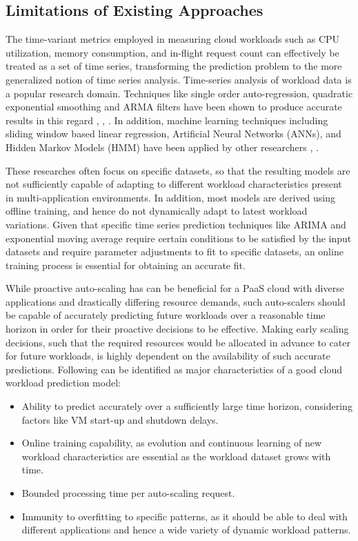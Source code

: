 \subsection{Limitations of Existing Approaches}

The time-variant metrics employed in measuring cloud workloads such as CPU utilization, memory consumption, and in-flight request count can effectively be treated as a set of time series, transforming the prediction problem to the more generalized notion of time series analysis. Time-series analysis of workload data is a popular research domain. Techniques like single order auto-regression, quadratic exponential smoothing and ARMA filters have been shown to produce accurate results in this regard \cite{Kupferman_2009}, \cite{Mi_2010}, \cite{Roy_2011}. In addition, machine learning techniques including sliding window based linear regression, Artificial Neural Networks (ANNs), and Hidden Markov Models (HMM) have been applied by other researchers \cite{Yang_2013}, \cite{Khan_2012}.

These researches often focus on specific datasets, so that the resulting models are not sufficiently capable of adapting to different workload characteristics present in multi-application environments. In addition, most models are derived using offline training, and hence do not dynamically adapt to latest workload variations. Given that specific time series prediction techniques like ARIMA and exponential moving average require certain conditions to be satisfied by the input datasets and require parameter adjustments to fit to specific datasets, an online training process is essential for obtaining an accurate fit.

While proactive auto-scaling has can be beneficial for a PaaS cloud with diverse applications and drastically differing resource demands, such auto-scalers should be capable of accurately predicting future workloads over a reasonable time horizon in order for their proactive decisions to be effective. Making early scaling decisions, such that the required resources would be allocated in advance to cater for future workloads, is highly dependent on the availability of such accurate predictions. Following can be identified as major characteristics of a good cloud workload prediction model:

\begin{itemize}
\item Ability to predict accurately over a sufficiently large time horizon, considering factors like VM start-up and shutdown delays.
\item Online training capability, as evolution and continuous learning of new workload characteristics are essential as the workload dataset grows with time.
\item Bounded processing time per auto-scaling request.
\item Immunity to overfitting to specific patterns, as it should be able to deal with different applications and hence a wide variety of dynamic workload patterns.
\end{itemize}
